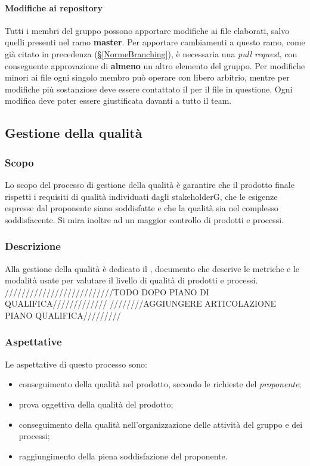 \paragraph{Modifiche ai repository}
Tutti i membri del gruppo possono apportare modifiche ai file elaborati, salvo quelli presenti nel ramo \textbf{master}. Per apportare cambiamenti a questo ramo, come già citato in precedenza (\S{}\ref{NormeBranching}), è necessaria una \textit{pull request}, con conseguente approvazione di \textbf{almeno} un altro elemento del gruppo.\newline
Per modifiche minori ai file ogni singolo membro può operare con libero arbitrio, mentre per modifiche più sostanziose deve essere contattato il \RdP{} per il file in questione.\newline
Ogni modifica deve poter essere giustificata davanti a tutto il team.
\subsection{Gestione della qualità}
\subsubsection{Scopo}
Lo scopo del processo di gestione della qualità è garantire che il prodotto finale rispetti i requisiti di qualità individuati dagli stakeholderG, che le esigenze espresse dal proponente siano soddisfatte e che la qualità sia nel complesso soddisfacente. Si mira inoltre ad un maggior controllo di prodotti e processi.
\subsubsection{Descrizione}
Alla gestione della qualità è dedicato il \PdQ{}, documento che descrive le metriche e le modalità usate per valutare il livello di qualità di prodotti e processi.
//////////////////////////TODO DOPO PIANO DI QUALIFICA/////////////
////////AGGIUNGERE ARTICOLAZIONE PIANO QUALIFICA/////////
\subsubsection{Aspettative}
Le aspettative di questo processo sono:
\begin{itemize}
	\item conseguimento della qualità nel prodotto, secondo le richieste del \textit{proponente};
	\item prova oggettiva della qualità del prodotto;
	\item conseguimento della qualità nell'organizzazione delle attività del gruppo e dei processi;
	\item raggiungimento della piena soddisfazione del proponente.
\end{itemize}
